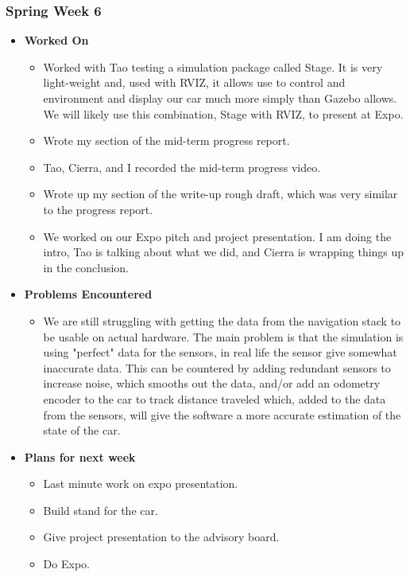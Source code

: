\documentclass{article}
\begin{document}
\subsubsection{Spring Week 6}
\begin{itemize}
    \item {\textbf{Worked On}}
    \begin{itemize}
        \item Worked with Tao testing a simulation package called Stage. It is very light-weight and, used with RVIZ, it allows use to control and environment and display our car much more simply than Gazebo allows. We will likely use this combination, Stage with RVIZ, to present at Expo.
        \item Wrote my section of the mid-term progress report.
        \item Tao, Cierra, and I recorded the mid-term progress video.
        \item Wrote up my section of the write-up rough draft, which was very similar to the progress report.
        \item We worked on our Expo pitch and project presentation. I am doing the intro, Tao is talking about what we did, and Cierra is wrapping things up in the conclusion.
    \end{itemize}

    \item {\textbf{Problems Encountered}}
    \begin{itemize}
        \item We are still struggling with getting the data from the navigation stack to be usable on actual hardware. The main problem is that the simulation is using "perfect" data for the sensors, in real life the sensor give somewhat inaccurate data. This can be countered by adding redundant sensors to increase noise, which smooths out the data, and/or add an odometry encoder to the car to track distance traveled which, added to the data from the sensors, will give the software a more accurate estimation of the state of the car.
    \end{itemize}

    \item{\textbf{Plans for next week}}
    \begin{itemize}
        \item Last minute work on expo presentation.
        \item Build stand for the car.
        \item Give project presentation to the advisory board.
        \item Do Expo.
    \end{itemize}
\end{itemize}
\end{document}
